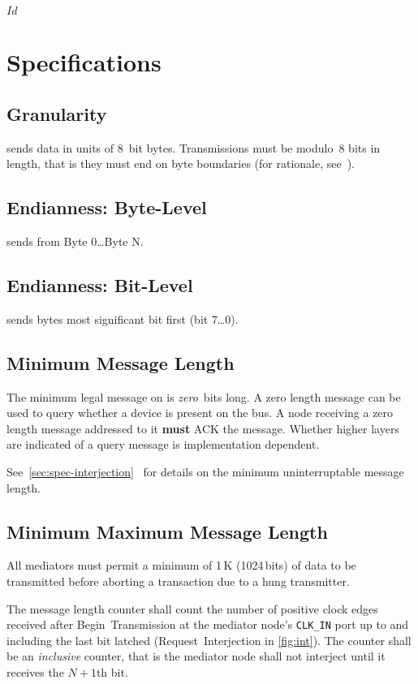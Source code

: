 \svnInfo $Id$

\section{Specifications}
\label{sec:spec}

\subsection{Granularity}
\label{sec:spec-granularity}
\bus sends data in units of 8~bit bytes. Transmissions must be modulo~8 bits
in length, that is they must end on byte boundaries (for rationale,
see~).

\subsection{Endianness: Byte-Level}
\bus sends from Byte 0{\ldots}Byte N.

\subsection{Endianness: Bit-Level}
\bus sends bytes most significant bit first (bit 7{\ldots}0).

\subsection{Minimum Message Length}
The minimum legal message on \bus is {\em zero}~bits long. A zero length
message can be used to query whether a device is present on the bus. A node
receiving a zero length message addressed to it {\bf must} ACK the message.
Whether higher layers are indicated of a query message is implementation
dependent.

See~\ref{sec:spec-interjection}~ for details on
the minimum uninterruptable message length.

\subsection{Minimum Maximum Message Length}
All \bus mediators must permit a minimum of 1\,K (1024\,bits) of data to be
transmitted before aborting a transaction due to a hung transmitter.

The message length counter shall count the number of positive clock edges
received after Begin~Transmission at the mediator node's {\tt CLK\_IN} port up
to and including the last bit latched (Request~Interjection in
\cref{fig:int}). The counter shall be an {\em inclusive} counter,
that is the mediator node shall not interject until it receives the $N+1$th
bit.

